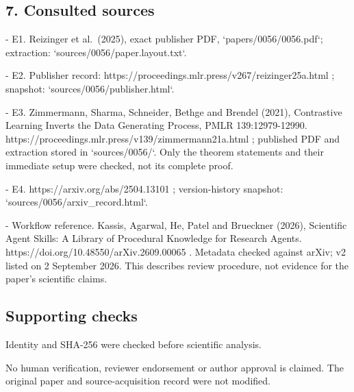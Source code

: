 \documentclass[10pt]{article}
\begin{document}
\subsection*{7. Consulted sources}
- E1. Reizinger et al. (2025), exact publisher PDF, `papers/0056/0056.pdf`; extraction: `sources/0056/paper.layout.txt`.\par
- E2. Publisher record: https://proceedings.mlr.press/v267/reizinger25a.html ; snapshot: `sources/0056/publisher.html`.\par
- E3. Zimmermann, Sharma, Schneider, Bethge and Brendel (2021), Contrastive Learning Inverts the Data Generating Process, PMLR 139:12979-12990. https://proceedings.mlr.press/v139/zimmermann21a.html ; published PDF and extraction stored in `sources/0056/`. Only the theorem statements and their immediate setup were checked, not its complete proof.\par
- E4. https://arxiv.org/abs/2504.13101 ; version-history snapshot: `sources/0056/arxiv\_record.html`.\par
- Workflow reference. Kassis, Agarwal, He, Patel and Brueckner (2026), Scientific Agent Skills: A Library of Procedural Knowledge for Research Agents. https://doi.org/10.48550/arXiv.2609.00065 . Metadata checked against arXiv; v2 listed on 2 September 2026. This describes review procedure, not evidence for the paper’s scientific claims.\par
\subsection*{Supporting checks}
Identity and SHA-256 were checked before scientific analysis.\par
No human verification, reviewer endorsement or author approval is claimed. The original paper and source-acquisition record were not modified.\par
\end{document}
